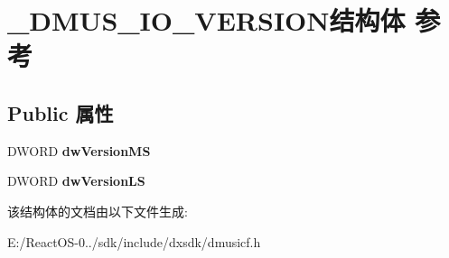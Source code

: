 \hypertarget{struct___d_m_u_s___i_o___v_e_r_s_i_o_n}{}\section{\+\_\+\+D\+M\+U\+S\+\_\+\+I\+O\+\_\+\+V\+E\+R\+S\+I\+O\+N结构体 参考}
\label{struct___d_m_u_s___i_o___v_e_r_s_i_o_n}
\subsection*{Public 属性}
\begin{DoxyCompactItemize}
\item 
\mbox{\label{struct___d_m_u_s___i_o___v_e_r_s_i_o_n_ac14382d0e904dc458618fd394a6ccb26}} 
D\+W\+O\+RD {\bfseries dw\+Version\+MS}
\item 
\mbox{\label{struct___d_m_u_s___i_o___v_e_r_s_i_o_n_ada9e17c60c1edbb62a39efcdc9030284}} 
D\+W\+O\+RD {\bfseries dw\+Version\+LS}
\end{DoxyCompactItemize}


该结构体的文档由以下文件生成\+:\begin{DoxyCompactItemize}
\item 
E\+:/\+React\+O\+S-\/0../sdk/include/dxsdk/dmusicf.\+h\end{DoxyCompactItemize}
